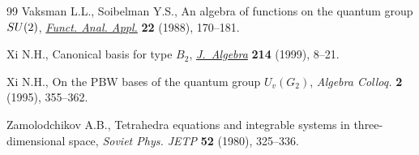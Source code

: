 \documentclass[11pt]{article}
\begin{document}
\begin{thebibliography}{99}
Vaksman L.L., Soibelman Y.S., An algebra of functions on the quantum group
  {${\rm SU}(2)$}, \href{http://dx.doi.org/10.1007/BF01077623}{\textit{Funct. Anal. Appl.}} \textbf{22} (1988), 170--181.

Xi N.H., Canonical basis for type {$B_2$}, \href{http://dx.doi.org/10.1006/jabr.1998.7688}{\textit{J.~Algebra}} \textbf{214}
  (1999), 8--21.

Xi N.H., On the {PBW} bases of the quantum group {$U_v(G_2)$}, \textit{Algebra
  Colloq.} \textbf{2} (1995), 355--362.

Zamolodchikov A.B., Tetrahedra equations and integrable systems in
  three-dimensional space, \textit{Soviet Phys. JETP} \textbf{52} (1980),
  325--336.

\end{thebibliography}
\end{document}
